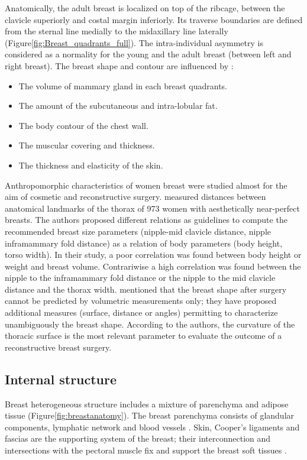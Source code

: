  Anatomically, the adult breast is localized on top of the ribcage, between the clavicle superiorly and costal margin inferiorly. Its traverse boundaries are defined from the sternal line medially to the midaxillary line laterally (Figure\ref{fig:Breast_quadrants_full}). The intra-individual asymmetry is considered as a normality for the young and the adult breast (between left and right breast). The breast shape and contour are influenced by \citep{mugea2014aesthetic}:
 \begin{itemize}
 \item The volume of mammary gland in each breast quadrants.
 \item The amount of the subcutaneous and intra-lobular fat.
 \item The body contour of the chest wall.
 \item The muscular covering and thickness.
 \item The thickness and elasticity of the skin.
 \end{itemize}

Anthropomorphic characteristics of women breast were studied almost for the aim of cosmetic and reconstructive surgery.  \cite{vandeput2002considerations} measured distances between anatomical landmarks of the thorax of 973 women with aesthetically near-perfect breasts. The authors proposed different relations as guidelines to compute the recommended breast size parameters (nipple-mid clavicle distance, nipple inframammary fold distance) as a relation of body parameters (body height, torso width). In their study, a poor correlation was found between body height or weight and breast volume. Contrariwise a high correlation was found between the nipple to the inframammary fold distance or the nipple to the mid clavicle distance and the thorax width. \cite{catanuto2008experimental} mentioned that the breast shape after surgery cannot be predicted by volumetric measurements only; they have proposed additional measures (surface, distance or angles) permitting to characterize unambiguously the breast shape. According to the authors, the curvature of the thoracic surface is the most relevant parameter to evaluate the outcome of a reconstructive breast surgery.


\subsection{Internal structure}\label{subsection:internalstructures}

Breast heterogeneous structure includes a mixture of parenchyma and adipose tissue (Figure\ref{fig:breastanatomy}). The breast parenchyma consists of glandular components, lymphatic network and blood vessels \citep{clemente2011anatomy}. Skin, Cooper's ligaments and fascias are the supporting system of the breast; their interconnection and intersections with the pectoral muscle fix and support the breast soft tissues \citep{mugea2014aesthetic}.

